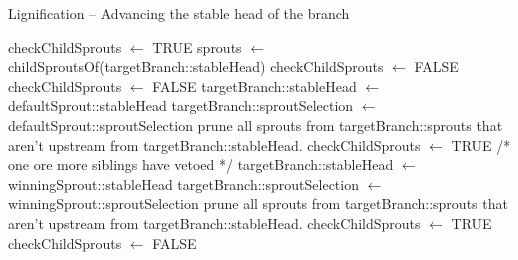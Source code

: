 \documentclass[14pt]{article}
\begin{document}
\begin{algorithm}[h!]
\caption{Lignification -- Advancing the stable head of the branch}
\begin{algorithmic} 
\STATE checkChildSprouts $\leftarrow$ TRUE
\STATE sprouts $\leftarrow$ childSproutsOf(targetBranch::stableHead)
\STATE checkChildSprouts $\leftarrow$ FALSE
\ELSE
{}
\STATE checkChildSprouts $\leftarrow$ FALSE
\ELSE
{}
\STATE targetBranch::stableHead $\leftarrow$ defaultSprout::stableHead
\STATE targetBranch::sproutSelection $\leftarrow$ defaultSprout::sproutSelection
\STATE prune all sprouts from targetBranch::sprouts that aren't upstream from targetBranch::stableHead.
\STATE checkChildSprouts $\leftarrow$ TRUE
\ELSE
\STATE /* one ore more siblings have vetoed */
\STATE targetBranch::stableHead $\leftarrow$ winningSprout::stableHead
\STATE targetBranch::sproutSelection $\leftarrow$ winningSprout::sproutSelection
\STATE prune all sprouts from targetBranch::sprouts that aren't upstream from targetBranch::stableHead.
\STATE checkChildSprouts $\leftarrow$ TRUE
\ELSE
\STATE checkChildSprouts $\leftarrow$ FALSE
\ENDIF
\ENDIF
\ENDIF
\ENDIF
\ENDWHILE
\RETURN
\end{algorithmic}

\label{alg:lignification}
\end{algorithm}
\end{document}
